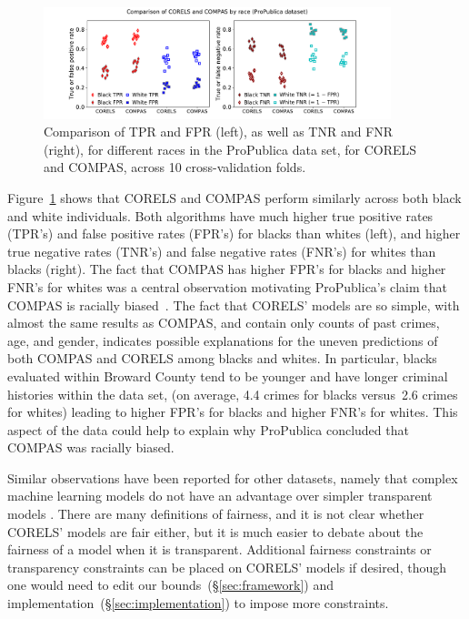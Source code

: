 \documentclass[twoside,11pt]{article}
\begin{document}
\begin{figure}[t!]
\begin{center}
\includegraphics[trim={35mm, 0mm, 40mm, 0mm},
width=0.9\textwidth]{figs/compare_corels_compas.pdf}
\end{center}
\caption{Comparison of TPR and FPR (left), as well as TNR and FNR (right),
for different races in the ProPublica data set, for CORELS and COMPAS,
across 10 cross-validation folds.
%
%
%
}
\label{fig:tpr-fpr}
\end{figure}

Figure~\ref{fig:tpr-fpr} shows that CORELS and COMPAS perform similarly across both black and white individuals.
%
Both algorithms have much higher true positive rates (TPR's) and false positive rates (FPR's) for blacks than whites (left), and higher true negative rates (TNR's) and false negative rates (FNR's) for whites than blacks (right).
%
The fact that COMPAS has higher FPR's for blacks and higher FNR's for whites was a central observation motivating ProPublica's claim that COMPAS is racially biased~\citep{LarsonMaKiAn16}.
%
The fact that CORELS' models are so simple, with almost the same results as COMPAS, and contain only counts of past crimes, age, and gender, indicates possible explanations for the uneven predictions of both COMPAS and CORELS among blacks and whites.
%
In particular, blacks evaluated within Broward County tend to be younger and have longer criminal histories within the data set,
(on average, 4.4 crimes for blacks versus~2.6 crimes for whites)
leading to higher FPR's for blacks and higher FNR's for whites.
%
This aspect of the data could help to explain why ProPublica concluded that COMPAS was racially biased. 

Similar observations have been reported for other datasets, namely that complex machine learning models do not have an advantage over simpler transparent models \citep{tollenaar2013method,bushway2013there,ZengUsRu2017}.
%
There are many definitions of fairness, and it is not clear whether CORELS' models are fair either, but it is much easier to debate about the fairness of a model when it is transparent.
%
Additional fairness constraints or transparency constraints can be placed on CORELS' models if desired, though one would need to edit our bounds~(\S\ref{sec:framework}) and implementation~(\S\ref{sec:implementation}) to impose more constraints.
\end{document}
